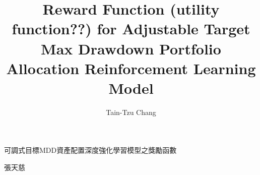 

\title{Reward Function (utility function??) for Adjustable Target Max Drawdown Portfolio Allocation Reinforcement Learning Model}{可調式目標MDD資產配置深度強化學習模型之獎勵函數}
\author{Tain-Tzu Chang}{張天慈}
